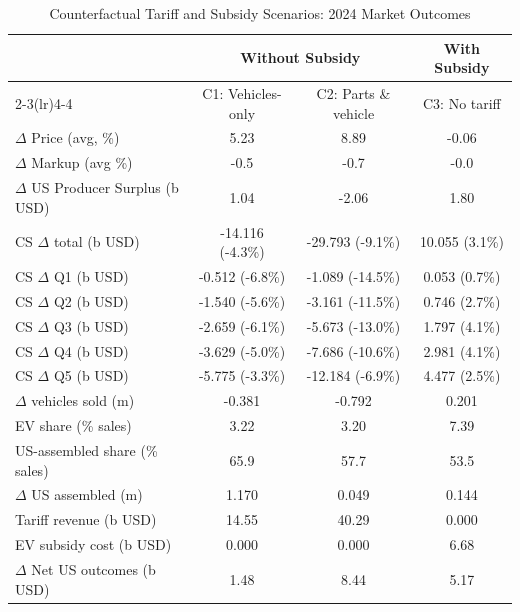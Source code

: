\begin{table}[!htbp]
\centering
\caption{Counterfactual Tariff and Subsidy Scenarios: 2024 Market Outcomes}
\label{tab:cf_summary}
\small
\setlength{\tabcolsep}{6pt}
\renewcommand{\arraystretch}{1.10}
\begin{threeparttable}
\begin{tabular}{lccc}
\toprule
 & \multicolumn{2}{c}{Without Subsidy} & With Subsidy \\
\cmidrule(lr){2-3}\cmidrule(lr){4-4}
 & C1: Vehicles-only & C2: Parts \& vehicle & C3: No tariff \\
\midrule
$\Delta$ Price (avg, \%) & 5.23 & 8.89 & -0.06 \\
$\Delta$ Markup (avg \%) & -0.5 & -0.7 & -0.0 \\
$\Delta$ US Producer Surplus (b USD) & 1.04 & -2.06 & 1.80 \\
CS $\Delta$ total (b USD) & -14.116 (-4.3\%) & -29.793 (-9.1\%) & 10.055 (3.1\%) \\
CS $\Delta$ Q1 (b USD) & -0.512 (-6.8\%) & -1.089 (-14.5\%) & 0.053 (0.7\%) \\
CS $\Delta$ Q2 (b USD) & -1.540 (-5.6\%) & -3.161 (-11.5\%) & 0.746 (2.7\%) \\
CS $\Delta$ Q3 (b USD) & -2.659 (-6.1\%) & -5.673 (-13.0\%) & 1.797 (4.1\%) \\
CS $\Delta$ Q4 (b USD) & -3.629 (-5.0\%) & -7.686 (-10.6\%) & 2.981 (4.1\%) \\
CS $\Delta$ Q5 (b USD) & -5.775 (-3.3\%) & -12.184 (-6.9\%) & 4.477 (2.5\%) \\
$\Delta$ vehicles sold (m) & -0.381 & -0.792 & 0.201 \\
EV share (\% sales) & 3.22 & 3.20 & 7.39 \\
US-assembled share (\% sales) & 65.9 & 57.7 & 53.5 \\
$\Delta$ US assembled (m) & 1.170 & 0.049 & 0.144 \\
Tariff revenue (b USD) & 14.55 & 40.29 & 0.000 \\
EV subsidy cost (b USD) & 0.000 & 0.000 & 6.68 \\
$\Delta$ Net US outcomes (b USD) & 1.48 & 8.44 & 5.17 \\
\bottomrule
\end{tabular}
\end{threeparttable}
\end{table}
